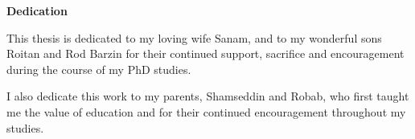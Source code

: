 
\begin{center}\textbf{Dedication}\end{center}

This thesis is dedicated to my loving wife Sanam, and to my wonderful sons Roitan and Rod Barzin for their continued support, sacrifice and encouragement during the course of my PhD studies. 

I also dedicate this work to my parents, Shamseddin and Robab, who first taught me the value of education and for their continued encouragement throughout my studies.


\cleardoublepage
